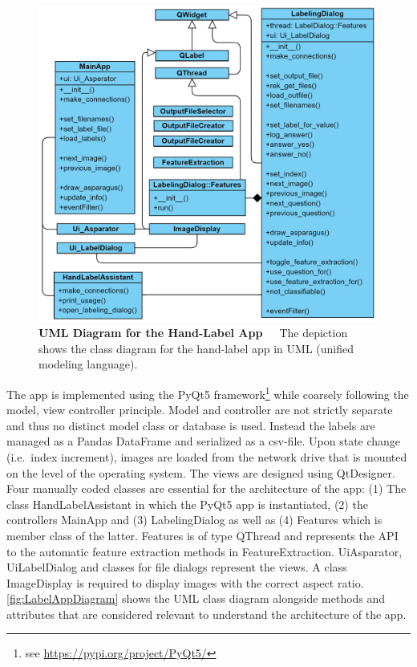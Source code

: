 \begin{figure}[!t]
	\centering
	\includegraphics[scale=0.3]{Figures/chapter03/label_app_diagram.png}
	\decoRule
	\caption[UML Diagram for the Hand-Label App]{\textbf{UML Diagram for the Hand-Label App}~~~The depiction shows the class diagram for the hand-label app in UML (unified modeling language).}
	\label{fig:LabelAppDiagram}
\end{figure}

The app is implemented using the PyQt5 framework\footnote{see \url{https://pypi.org/project/PyQt5/}} while coarsely following the model, view controller principle. Model and controller are not strictly separate and thus no distinct model class or database is used. Instead the labels are managed as a Pandas DataFrame and serialized as a csv-file. Upon state change (i.e.\ index increment), images are loaded from the network drive that is mounted on the level of the operating system. The views are designed using QtDesigner. Four manually coded classes are essential for the architecture of the app: (1) The class HandLabelAssistant in which the PyQt5 app is instantiated, (2) the controllers MainApp and (3) LabelingDialog as well as (4) Features which is member class of the latter. Features is of type QThread and represents the API to the automatic feature extraction methods in FeatureExtraction. Ui\textunderscore Asparator, UiLabelDialog and classes for file dialogs represent the views. A class ImageDisplay is required to display images with the correct aspect ratio. \autoref{fig:LabelAppDiagram} shows the UML class diagram alongside methods and attributes that are considered relevant to understand the architecture of the app. 

